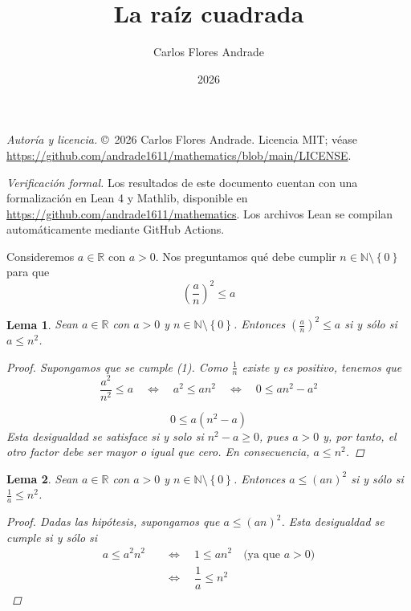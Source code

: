 \documentclass[10pt,a4paper]{article}
\title{La ra\'iz cuadrada}
\author{Carlos Flores Andrade}
\date{2026}
\theoremstyle{ts}
\newtheorem{lem}{Lema}[section]
\newcommand{\rpar}[1]{\left( #1\right) }
\newcommand{\rllav}[1]{\left\lbrace #1\right\rbrace }
\begin{document}
\maketitle

\noindent\textit{Autor\'ia y licencia.} \copyright\ 2026 Carlos Flores Andrade. Licencia MIT; v\'ease \url{https://github.com/andrade1611/mathematics/blob/main/LICENSE}.

\noindent\textit{Verificaci\'on formal.} Los resultados de este documento cuentan con una formalizaci\'on en Lean 4 y Mathlib, disponible en \url{https://github.com/andrade1611/mathematics}. Los archivos Lean se compilan autom\'aticamente mediante GitHub Actions.

Consideremos $a\in\mathbb{R}$ con $a>0$. Nos preguntamos qué debe cumplir $n\in\mathbb{N}\setminus\rllav{0}$ para que
\begin{equation}
\tag{1}
\rpar{\dfrac{a}{n}}^2\leq a
\end{equation}

\begin{lem}\label{lema1}
Sean $a\in\mathbb{R}$ con $a>0$ y $n\in\mathbb{N}\setminus\rllav{0}$. Entonces $\rpar{\frac{a}{n}}^2\leq a$ si y s\'olo si $a\leq n^2$.
\begin{proof}
Supongamos que se cumple (1). Como $\frac{1}{n}$ existe y es positivo, tenemos que
\[
\dfrac{a^2}{n^2}\leq a\quad \Longleftrightarrow\quad a^2\leq an^2 \quad\Longleftrightarrow\quad 0\leq an^2-a^2
\]

\[
0\leq a(n^2-a)
\]
Esta desigualdad se satisface si y solo si $n^2-a\geq 0$, pues $a>0$ y, por tanto, el otro factor debe ser mayor o igual que cero. En consecuencia, $a\leq n^2$.
\end{proof}
\end{lem}

\begin{lem}\label{lema2}
Sean $a\in\mathbb{R}$ con $a>0$ y $n\in\mathbb{N}\setminus\rllav{0}$. Entonces $a\leq(an)^2$ si y s\'olo si $\frac{1}{a}\leq n^2$.
\begin{proof}
Dadas las hip\'otesis, supongamos que $a\leq(an)^2$. Esta desigualdad se cumple si y s\'olo si
\begin{align*}
a\leq a^2n^2 &\quad\Longleftrightarrow\quad 1\leq an^2 \quad\text{(ya que $a>0$)}\\
&\quad\Longleftrightarrow\quad \dfrac{1}{a}\leq n^2
\end{align*}
\end{proof}
\end{lem}
\end{document}
